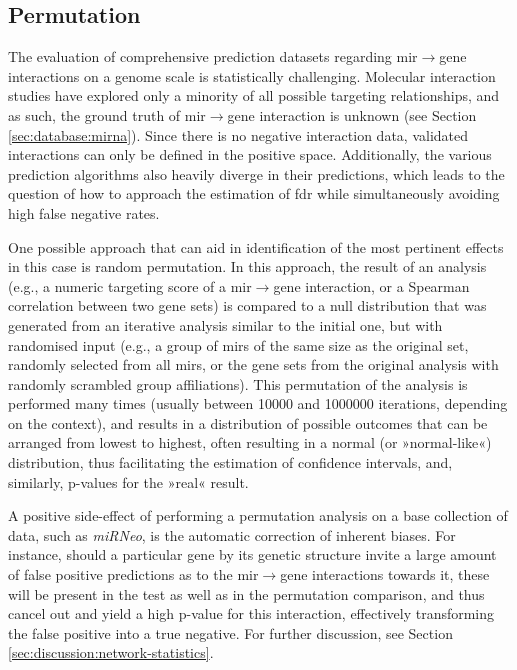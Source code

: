 \begin{method}

\subsection{Permutation} \label{sec:database:permutation}
The evaluation of comprehensive prediction datasets regarding \ac{mir}$\to$gene interactions on a genome scale is statistically challenging. Molecular interaction studies have explored only a minority of all possible targeting relationships, and as such, the ground truth of \ac{mir}$\to$gene interaction is unknown (see Section \ref{sec:database:mirna}). Since there is no negative interaction data, validated interactions can only be defined in the positive space. Additionally, the various prediction algorithms also heavily diverge in their predictions, which leads to the question of how to approach the estimation of \acf{fdr} while simultaneously avoiding high false negative rates.

One possible approach that can aid in identification of the most pertinent effects in this case is random permutation. In this approach, the result of an analysis (e.g., a numeric targeting score of a \ac{mir}$\to$gene interaction, or a Spearman correlation between two gene sets) is compared to a null distribution that was generated from an iterative analysis similar to the initial one, but with randomised input (e.g., a group of \acp{mir} of the same size as the original set, randomly selected from all \acp{mir}, or the gene sets from the original analysis with randomly scrambled group affiliations). This permutation of the analysis is performed many times (usually between \num{10000} and \num{1000000} iterations, depending on the context), and results in a distribution of possible outcomes that can be arranged from lowest to highest, often resulting in a normal (or »normal-like«) distribution, thus facilitating the estimation of confidence intervals, and, similarly, p-values for the »real« result.

A positive side-effect of performing a permutation analysis on a base collection of data, such as \textit{miRNeo}, is the automatic correction of inherent biases. For instance, should a particular gene by its genetic structure invite a large amount of false positive predictions as to the \ac{mir}$\to$gene interactions towards it, these will be present in the test as well as in the permutation comparison, and thus cancel out and yield a high p-value for this interaction, effectively transforming the false positive into a true negative. For further discussion, see Section \ref{sec:discussion:network-statistics}.


\end{method}
